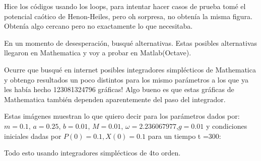 \documentclass[idxtotoc,hyperref,openany]{labbook} %
\begin{document}
Hice los códigos usando los loops, para intentar hacer casos de prueba tomé el potencial caótico de Henon-Heiles, pero oh sorpresa, no obtenía la misma figura. Obtenía algo cercano pero no exactamente lo que necesitaba.\par

En un momento de desesperación, busqué alternativas. Estas posibles alternativas llegaron en Mathematica y voy a probar en Matlab(Octave). \par
Ocurre que busqué en internet posibles integradores simplécticos de Mathematica y obtengo resultados un poco distintos para los mismo parámetros a los que ya les había hecho 123081324796 gráficas! Algo bueno es que estas gráficas de Mathematica también dependen aparentemente del paso del integrador.\par
Estas imágenes muestran lo que quiero decir para los parámetros dados por: $m=0.1$, $a=0.25$, $b=0.01$, $M=0.01$, $\omega=2.236067977$,$g=0.01$ y condiciones iniciales dadas por $P(0)=0.1,X(0)=0.1$ para un tiempo t =300:\par

Todo esto usando integradores simplécticos de 4to orden.
\end{document}
